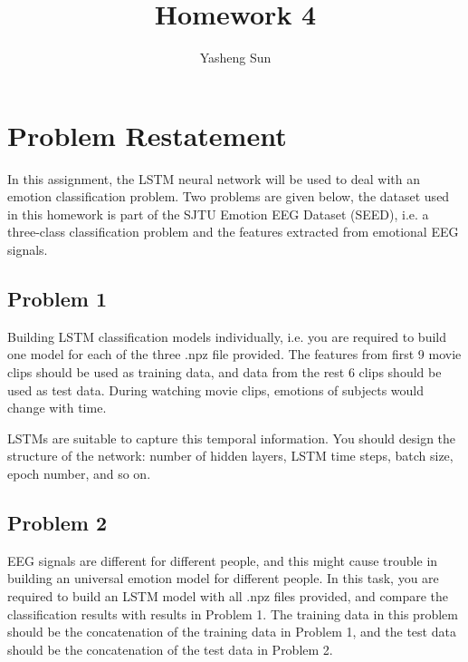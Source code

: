 \documentclass[12pt]{article}
\begin{document}
\title{Homework 4}
\author{Yasheng Sun}
\date{}

\section{Problem Restatement}
In this assignment, the LSTM neural network will be used to deal with an emotion classification problem. Two problems are given below, the dataset used in this homework is part of the SJTU Emotion EEG Dataset (SEED), i.e. a three-class classification problem and the features extracted from emotional EEG signals. 

\subsection{Problem 1}
Building LSTM classification models individually, i.e. you are required to build one model for each of the three .npz file provided. The features from first 9 movie clips should be used as training data, and data from the rest 6 clips should be used as test data.
During watching movie clips, emotions of subjects would change with time.
  
LSTMs are suitable to capture this temporal information.
You should design the structure of the network: number of hidden layers, LSTM
time steps, batch size, epoch number, and so on.

\subsection{Problem 2}
EEG signals are different for different people, and this might cause trouble in building an universal emotion model for different people.
In this task, you are required to build an LSTM model with all .npz files provided, and compare the classification results with results in Problem 1.
The training data in this problem should be the concatenation of the training data in Problem 1, and the test data should be the concatenation of the test data in Problem 2.
\end{document}
